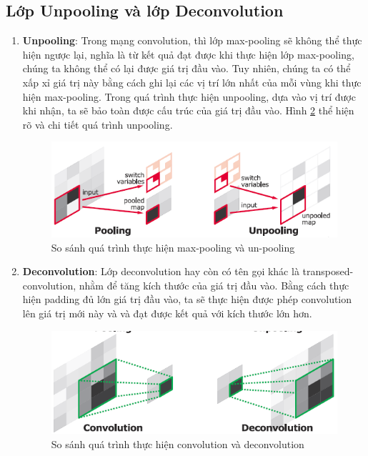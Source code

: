 \subsection{Lớp Unpooling và lớp Deconvolution}
\begin{enumerate}
\item \textbf{Unpooling}: Trong mạng convolution, thì lớp max-pooling sẽ không thể thực hiện ngược lại, nghĩa là từ kết quả đạt được khi thực hiện lớp max-pooling, chúng ta không thể có lại được giá trị đầu vào. Tuy nhiên, chúng ta có thể xấp xỉ giá trị này bằng cách ghi lại các vị trí lớn nhất của mỗi vùng khi thực hiện max-pooling. Trong quá trình thực hiện unpooling, dựa vào vị trí được khi nhận, ta sẽ bảo toàn được cấu trúc của giá trị đầu vào. Hình \ref{fig:unpooling} thể hiện rõ và chi tiết quá trình unpooling. 


\begin{center}
    \begin{figure}[H]
    \begin{center}
     \includegraphics[scale=.6]{image/unpooling}
    \end{center}
    \caption{So sánh quá trình thực hiện max-pooling và un-pooling}
    \label{fig:unpooling}
    \end{figure}
\end{center}

\item \textbf{Deconvolution}: Lớp deconvolution hay còn có tên gọi khác là transposed-convolution, nhằm để tăng kích thước của giá trị đầu vào. Bằng cách thực hiện padding đủ lớn giá trị đầu vào, ta sẽ thực hiện được phép convolution lên giá trị mới này và và đạt được kết quả với kích thước lớn hơn.  


\begin{center}
    \begin{figure}[H]
    \begin{center}
     \includegraphics[scale=.6]{image/deconv}
    \end{center}
    \caption{So sánh quá trình thực hiện convolution và deconvolution}
    \label{fig:unpooling}
    \end{figure}
\end{center}


\end{enumerate}

